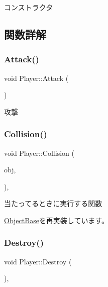 コンストラクタ 



\subsection{関数詳解}
\mbox{\label{class_player_a6c879db24d39d894207e078eb4c56e8d}} 
\subsubsection{\texorpdfstring{Attack()}{Attack()}}
{\footnotesize\ttfamily void Player\+::\+Attack (\begin{DoxyParamCaption}{ }\end{DoxyParamCaption})}



攻撃 

\mbox{\label{class_player_a184fbb2c70e34fb6c6a0c2fc7e0f86c9}} 
\subsubsection{\texorpdfstring{Collision()}{Collision()}}
{\footnotesize\ttfamily void Player\+::\+Collision (\begin{DoxyParamCaption}\item[{\mbox{\hyperlink{class_object_base}{Object\+Base}} $\ast$}]{obj,  }\item[{\mbox{\hyperlink{common_8h_afb0c5e21d4133ff4f200992c0b534e1b}{V\+E\+C2}}}]{ }\end{DoxyParamCaption})\hspace{0.3cm}{\ttfamily [final]}, {\ttfamily [virtual]}}



当たってるときに実行する関数 



\mbox{\hyperlink{class_object_base_ad772d7a42f5e46c39481f5db22ee8193}{Object\+Base}}を再実装しています。

\mbox{\label{class_player_af2cf4936165ef12cce96f7994e0879df}} 
\subsubsection{\texorpdfstring{Destroy()}{Destroy()}}
{\footnotesize\ttfamily void Player\+::\+Destroy (\begin{DoxyParamCaption}{ }\end{DoxyParamCaption})\hspace{0.3cm}{\ttfamily [final]}, {\ttfamily [virtual]}}



